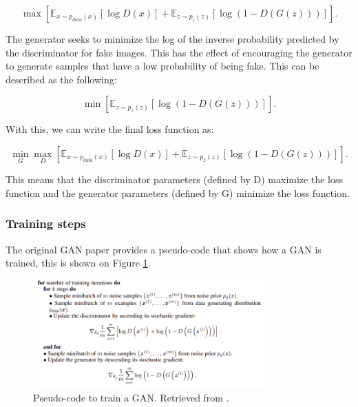 \begin{equation}
    \max [\mathbb{E}_{x\sim p_{data}(x)}[\log{D(x)}]+\mathbb{E}_{z\sim p_{z}(z)}[\log{(1-D(G(z)))}]].
    \label{eq:GAN}
\end{equation}

The generator seeks to minimize the log of the inverse probability predicted by the discriminator for fake images. This has the effect of encouraging the generator to generate samples that have a low probability of being fake. This can be described as the following:

\begin{equation}
    \min [\mathbb{E}_{z\sim p_{z}(z)}[\log{(1-D(G(z)))}]].
\end{equation}

With this, we can write the final loss function as:

\begin{equation}
   \min_{G} \max_{D} [\mathbb{E}_{x\sim p_{data}(x)}[\log{D(x)}]+\mathbb{E}_{z\sim p_{z}(z)}[\log{(1-D(G(z)))}]].
\end{equation}

This means that the discriminator parameters (defined by D) maximize the loss function and the generator parameters (defined by G) minimize the loss function.

\subsubsection*{Training steps}

The original \ac{GAN} paper provides a pseudo-code that shows how a \ac{GAN} is trained, this is shown on Figure \ref{fig:code}.

\begin{figure}[!htb]
  \centering
  \includegraphics[width=0.80\textwidth]{Images/code.jpg}
  \caption[Pseudo-code to train a \ac{GAN}.]{Pseudo-code to train a \ac{GAN}. Retrieved from \cite{GAN_original}.}
  \label{fig:code}
\end{figure}

